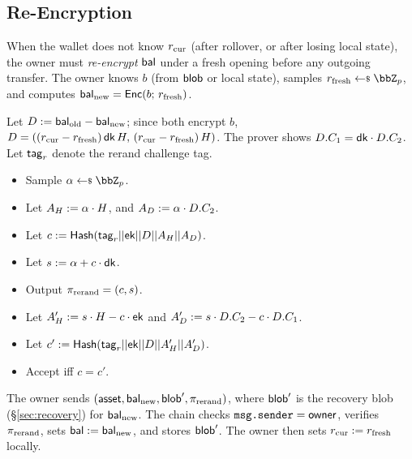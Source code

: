 \subsection{Re-Encryption}
\label{sec:reencrypt}

When the wallet does not know $r_{\rm cur}$ (after rollover, or after losing local state), the owner must \emph{re-encrypt} $\mathsf{bal}$ under a fresh opening before any outgoing transfer.
The owner knows $b$ (from $\mathsf{blob}$ or local state), samples $r_{\rm fresh} \getsr \Z_p$, and computes $\mathsf{bal}_{\rm new} = {\mathsf{Enc}}(b;\, r_{\rm fresh})$.

Let $D := \mathsf{bal}_{\rm old} - \mathsf{bal}_{\rm new}$; since both encrypt $b$, $D = ((r_{\rm cur} - r_{\rm fresh})\,\textsf{dk}\,H,\, (r_{\rm cur} - r_{\rm fresh})\,H)$.
The prover shows $D.C_1 = \textsf{dk} \cdot D.C_2$.
Let $\mathsf{tag}_r$ denote the rerand challenge tag.

\two
{}
%
\begin{itemize}[itemsep=.5pt]
    \item Sample $\alpha \getsr \Z_p$.
    \item Let $A_H := \alpha \cdot H$, and $A_D := \alpha \cdot D.C_2$.
    \item Let $c := \mathsf{Hash}(\mathsf{tag}_r \vert\vert \textsf{ek} \vert\vert D \vert\vert A_H \vert\vert A_D)$.
    \item Let $s := \alpha + c \cdot \textsf{dk}$.
    \item Output $\pi_{\rm rerand} = (c, s)$.
\end{itemize}

\two
{}
\begin{itemize}[itemsep=0.5pt]
    \item Let $A'_H := s \cdot H - c \cdot \textsf{ek}$ and $A'_D := s \cdot D.C_2 - c \cdot D.C_1$.
    \item Let $c' := \mathsf{Hash}(\mathsf{tag}_r \vert\vert \textsf{ek} \vert\vert D \vert\vert A'_H \vert\vert A'_D)$.
    \item Accept iff $c = c'$.
\end{itemize}

The owner sends $(\mathsf{asset}, \mathsf{bal}_{\rm new}, \mathsf{blob}', \pi_{\rm rerand})$, where $\mathsf{blob}'$ is the recovery blob (\S\ref{sec:recovery}) for $\mathsf{bal}_{\rm new}$.
The chain checks $\texttt{msg.sender} = \mathsf{owner}$, verifies $\pi_{\rm rerand}$, sets $\mathsf{bal} := \mathsf{bal}_{\rm new}$, and stores $\mathsf{blob}'$.
The owner then sets $r_{\rm cur} := r_{\rm fresh}$ locally.

